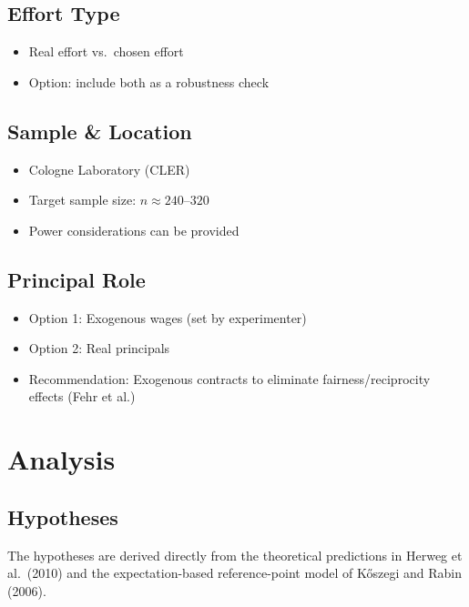 \documentclass[
    11pt,
    a4paper,
    parskip=half,
    headings=normal
]{scrartcl}
\numberwithin{equation}{section}
\theoremstyle{definition}
\theoremstyle{remark}
\begin{document}
\subsection*{Effort Type}

\begin{itemize}
    \item Real effort vs.\ chosen effort
    \item Option: include both as a robustness check
\end{itemize}

\vspace{0.5cm}

\subsection*{Sample \& Location}

\begin{itemize}
    \item Cologne Laboratory (CLER)
    \item Target sample size: $n \approx 240\text{--}320$
    \item Power considerations can be provided
\end{itemize}

\vspace{0.5cm}

\subsection*{Principal Role}

\begin{itemize}
    \item Option 1: Exogenous wages (set by experimenter)
    \item Option 2: Real principals
    \item Recommendation: Exogenous contracts to eliminate fairness/reciprocity effects (Fehr et al.)
\end{itemize}

\section{Analysis}

\subsection{Hypotheses}
The hypotheses are derived directly from the theoretical predictions in Herweg et al.\ (2010) and the expectation-based reference-point model of K\H{o}szegi and Rabin (2006).
\end{document}
